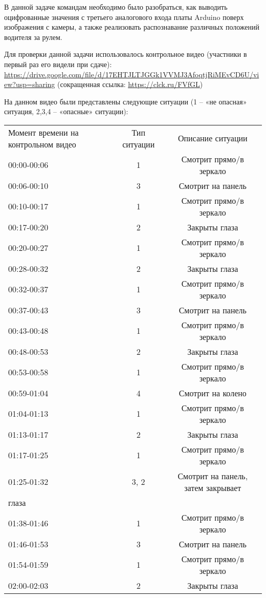 \solutionSection

В данной задаче командам необходимо было разобраться, как выводить оцифрованные значения с третьего аналогового входа платы Arduino поверх изображения с камеры, а также реализовать распознавание различных положений водителя за рулем. 

Для проверки данной задачи использовалось контрольное видео (участники в первый раз его видели при сдаче): \url{https://drive.google.com/file/d/17EHTJLTJGGk1VVMJ3AfoqtjRiMEvCD6U/view?usp=sharing} (сокращенная ссылка: \url{https://clck.ru/FVfGL})

На данном видео были представлены следующие ситуации (1 – «не опасная» ситуация, 2,3,4 – «опасные» ситуации):

\begin{table}[H]
    \begin{tabular}{|l|c|c|}
        Момент времени на контрольном видео & Тип ситуации & Описание ситуации \\
        00:00-00:06 & 1 & Смотрит прямо/в зеркало \\
        00:06-00:10 & 3 & Смотрит на панель \\
        00:10-00:17 & 1 & Смотрит прямо/в зеркало \\
        00:17-00:20 & 2 & Закрыты глаза \\
        00:20-00:27 & 1 & Смотрит прямо/в зеркало \\
        00:28-00:32 & 2 & Закрыты глаза \\
        00:32-00:37 & 1 & Смотрит прямо/в зеркало \\
        00:37-00:43 & 3 & Смотрит на панель \\
        00:43-00:48 & 1 & Смотрит прямо/в зеркало \\
        00:48-00:53 & 2 & Закрыты глаза \\
        00:53-00:58 & 1 & Смотрит прямо/в зеркало \\
        00:59-01:04 & 4 & Смотрит на колено \\
        01:04-01:13 & 1 & Смотрит прямо/в зеркало \\
        01:13-01:17 & 2 & Закрыты глаза \\
        01:17-01:25 & 1 & Смотрит прямо/в зеркало \\
        01:25-01:32 & 3, 2 & Смотрит на панель, затем закрывает \\ глаза \\
        01:38-01:46 & 1 & Смотрит прямо/в зеркало \\
        01:46-01:53 & 3 & Смотрит на панель \\
        01:54-01:59 & 1 & Смотрит прямо/в зеркало \\
        02:00-02:03 & 2 & Закрыты глаза \\
    \end{tabular}
\end{table}

